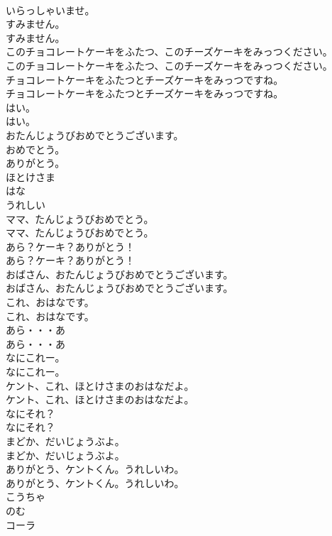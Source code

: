 \documentclass[8pt]{extreport}
\begin{document}
\begin{CJK}{UTF8}{min}
\\	いらっしゃいませ。 
\\	すみません。	
\\	すみません。 
\\	このチョコレートケーキをふたつ、このチーズケーキをみっつください。	
\\	このチョコレートケーキをふたつ、このチーズケーキをみっつください。 
\\	チョコレートケーキをふたつとチーズケーキをみっつですね。	
\\	チョコレートケーキをふたつとチーズケーキをみっつですね。 
\\	はい。	
\\	はい。 
\\	おたんじょうびおめでとうございます。
\\	おめでとう。
\\	ありがとう。
\\	ほとけさま
\\	はな
\\	うれしい
\\	ママ、たんじょうびおめでとう。	
\\	ママ、たんじょうびおめでとう。 
\\	あら？ケーキ？ありがとう！	
\\	あら？ケーキ？ありがとう！ 
\\	おばさん、おたんじょうびおめでとうございます。	
\\	おばさん、おたんじょうびおめでとうございます。 
\\	これ、おはなです。	
\\	これ、おはなです。 
\\	あら・・・あ	
\\	あら・・・あ 
\\	なにこれー。	
\\	なにこれー。 
\\	ケント、これ、ほとけさまのおはなだよ。	
\\	ケント、これ、ほとけさまのおはなだよ。 
\\	なにそれ？	
\\	なにそれ？ 
\\	まどか、だいじょうぶよ。	
\\	まどか、だいじょうぶよ。 
\\	ありがとう、ケントくん。うれしいわ。	
\\	ありがとう、ケントくん。うれしいわ。 
\\	こうちゃ
\\	のむ
\\	コーラ

\end{CJK}
\end{document}
